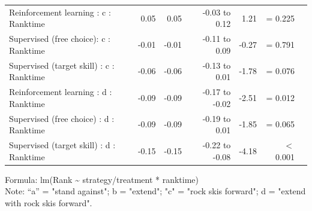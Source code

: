 \documentclass{article}
\begin{document}
\begin{longtable}{lrrrrrl}
Reinforcement learning : c : Ranktime & 0.05 & 0.05 & -0.03 to 0.12 & 1.21 &  =  0.225 \\ 
Supervised (free choice): c : Ranktime & -0.01 & -0.01 & -0.11 to 0.09 & -0.27 &  =  0.791 \\ 
Supervised (target skill) : c : Ranktime & -0.06 & -0.06 & -0.13 to 0.01 & -1.78 &  =  0.076 \\ 
Reinforcement learning : d : Ranktime & -0.09 & -0.09 & -0.17 to -0.02 & -2.51 &  =  0.012 \\ 
Supervised (free choice) : d : Ranktime & -0.09 & -0.09 & -0.19 to 0.01 & -1.85 &  =  0.065 \\ 
Supervised (target skill) : d : Ranktime & -0.15 & -0.15 & -0.22 to -0.08 & -4.18 &  $<$  0.001 \\ 
\bottomrule
\end{longtable}
\begin{minipage}{\linewidth}
Formula: lm(Rank \textasciitilde{} strategy/treatment * ranktime) \\
Note: “a” = "stand against"; b = "extend"; "c" = "rock skis forward"; d = "extend with rock skis forward". 
\end{minipage}
\end{document}
